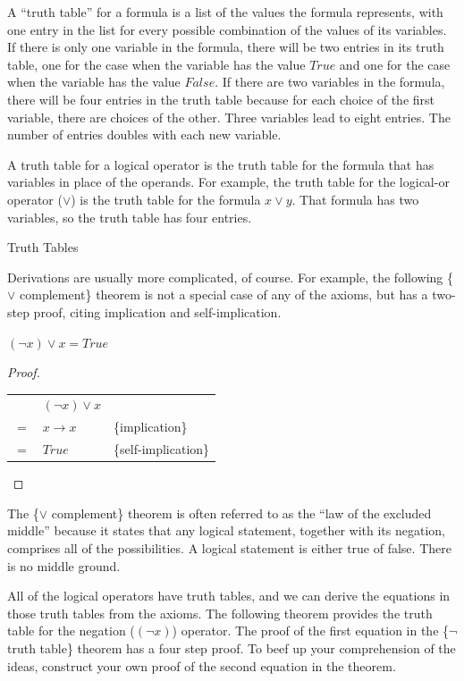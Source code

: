 \begin{aside}
A ``truth table'' for a formula is a list of the values the formula represents, with one entry in the list for every possible combination of the values of its variables. If there is only one variable in the formula, there will be two entries in its truth table, one for the case when the variable has the value $True$ and one for the case when the variable has the value $False$. If there are two variables in the formula, there will be four entries in the truth table because for each choice of the first variable, there are choices of the other. Three variables lead to eight entries. The number of entries doubles with each new variable.

A truth table for a logical operator is the truth table for the formula that has variables in place of the operands. For example, the truth table for the logical-or operator ($\vee$) is the truth table for the formula $x \vee y$. That formula has two variables, so the truth table has four entries.
\caption{Truth Tables}
\label{truth-tables}
\end{aside}

Derivations are usually more complicated, of course. For example, the following
\{$\vee$ complement\} theorem is not a special case of any
of the axioms, but has a two-step proof, citing implication
and self-implication.

\begin{theorem}
$(\neg x) \vee x = True$
\end{theorem}
\begin{proof}
\mbox{}\\
\begin{tabular}{lll}
    & $(\neg x) \vee x$ & \\
$=$ & $x \rightarrow x$ & \{implication\} \\
$=$ & $True$            & \{self-implication\} \\
\end{tabular}

\end{proof}

The \{$\vee$ complement\} theorem is often referred to as the
``law of the excluded middle'' because it states that any
logical statement, together with its negation, comprises all
of the possibilities. A logical statement is either true of false.
There is no middle ground.

All of the logical operators have truth tables, and we can derive the equations in those truth tables from the axioms. The following theorem provides the
truth table for the negation ($(\neg x)$) operator. The proof of the first equation in the \{$\neg$ truth table\} theorem has a four step proof.
To beef up your comprehension of the ideas, construct your own proof of the second equation in the theorem.


